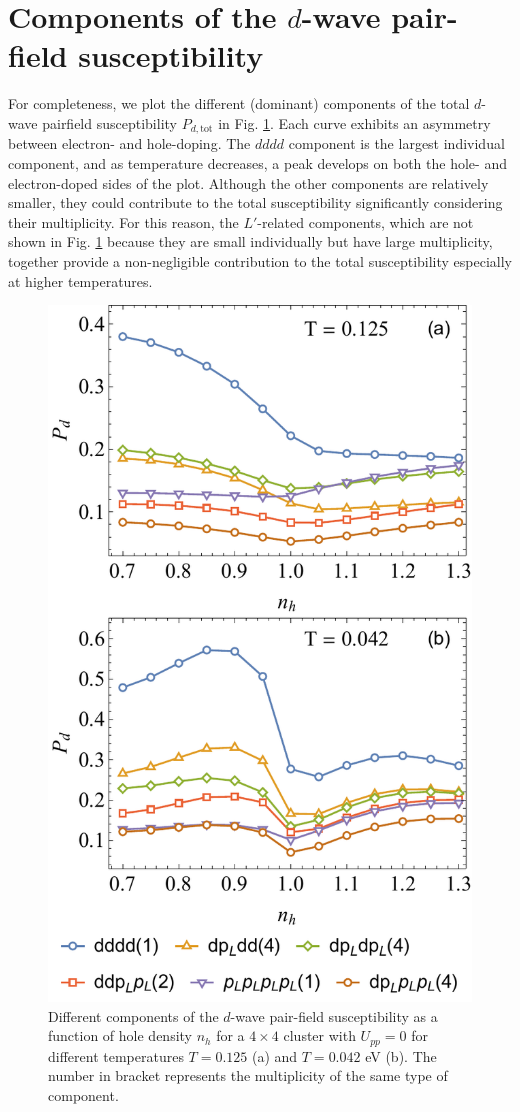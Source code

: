 \documentclass[reprint,nofootinbib,nobibnotes,amsmath,amssymb,aps,prb,floatfix]{revtex4-1}
\newcommand{\figdisp}[1]{Fig. \ref{#1}}
\begin{document}
\appendix

\section{Components of the $d$-wave pair-field susceptibility}\label{sec:appendix}
For completeness, we plot the different (dominant) components of the total $d$-wave pairfield susceptibility $P_{d,\text{tot}}$ in \figdisp{Pdcomponents}. Each curve exhibits an asymmetry between electron- and hole-doping. The $dddd$ component is the largest individual component, and as temperature decreases, a peak develops on both the hole- and electron-doped sides of the plot. Although the other components are relatively smaller, they could contribute to the total susceptibility significantly considering their multiplicity. For this reason, the $L'$-related components, which are not shown in \figdisp{Pdcomponents} because they are small individually but have large multiplicity, together provide a non-negligible contribution to the total susceptibility especially at higher temperatures.

\begin{figure}[ht]
\includegraphics[width=0.8\linewidth]{./Figures/Pdcomponents.pdf}
\caption{ Different components of the $d$-wave pair-field susceptibility as a function of hole density $n_h$ for a $4\times4$ cluster with $U_{pp}=0$ for different temperatures $T=0.125$ (a) and $T=0.042$ eV (b). The number in bracket represents the multiplicity of the same type of component.
}
\label{Pdcomponents}
\end{figure}
\end{document}
